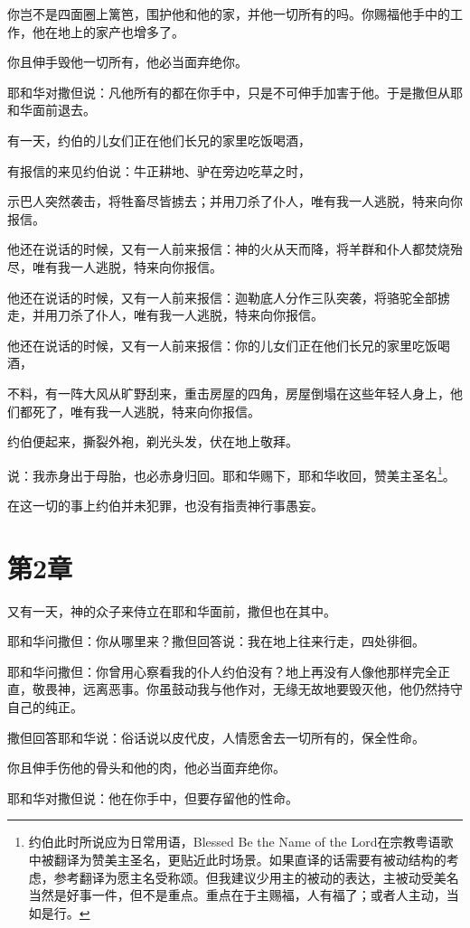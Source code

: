 \documentclass[12pt,oneside]{book}
\begin{document}
你岂不是四面圈上篱笆，围护他和他的家，并他一切所有的吗。你赐福他手中的工作，他在地上的家产也增多了。

你且伸手毁他一切所有，他必当面弃绝你。

耶和华对撒但说：凡他所有的都在你手中，只是不可伸手加害于他。于是撒但从耶和华面前退去。

有一天，约伯的儿女们正在他们长兄的家里吃饭喝酒，

有报信的来见约伯说：牛正耕地、驴在旁边吃草之时，

示巴人突然袭击，将牲畜尽皆掳去；并用刀杀了仆人，唯有我一人逃脱，特来向你报信。

他还在说话的时候，又有一人前来报信：神的火从天而降，将羊群和仆人都焚烧殆尽，唯有我一人逃脱，特来向你报信。

他还在说话的时候，又有一人前来报信：迦勒底人分作三队突袭，将骆驼全部掳走，并用刀杀了仆人，唯有我一人逃脱，特来向你报信。

他还在说话的时候，又有一人前来报信：你的儿女们正在他们长兄的家里吃饭喝酒，

不料，有一阵大风从旷野刮来，重击房屋的四角，房屋倒塌在这些年轻人身上，他们都死了，唯有我一人逃脱，特来向你报信。

约伯便起来，撕裂外袍，剃光头发，伏在地上敬拜。

说：我赤身出于母胎，也必赤身归回。耶和华赐下，耶和华收回，赞美主圣名\footnote{约伯此时所说应为日常用语，Blessed Be the Name of the Lord在宗教粤语歌中被翻译为赞美主圣名，更贴近此时场景。如果直译的话需要有被动结构的考虑，参考翻译为愿主名受称颂。但我建议少用主的被动的表达，主被动受美名当然是好事一件，但不是重点。重点在于主赐福，人有福了；或者人主动，当如是行。}。

在这一切的事上约伯并未犯罪，也没有指责神行事愚妄。

\chapter{第2章}
又有一天，神的众子来侍立在耶和华面前，撒但也在其中。

耶和华问撒但：你从哪里来？撒但回答说：我在地上往来行走，四处徘徊。

耶和华问撒但：你曾用心察看我的仆人约伯没有？地上再没有人像他那样完全正直，敬畏神，远离恶事。你虽鼓动我与他作对，无缘无故地要毁灭他，他仍然持守自己的纯正。

撒但回答耶和华说：俗话说以皮代皮，人情愿舍去一切所有的，保全性命。

你且伸手伤他的骨头和他的肉，他必当面弃绝你。

耶和华对撒但说：他在你手中，但要存留他的性命。
\end{document}
